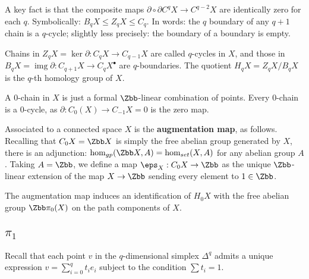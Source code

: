A key fact is that the composite maps $\partial \circ \partial C^{q}X\to C^{q-2}X $ are identically zero for each $q$. Symbolically: $B_qX \leq Z_q X \leq C_q$. In words: the $q$ boundary of any $q+1$ chain is a $q$-cycle; slightly less precisely: the boundary of a boundary is empty.

Chains in  $Z_qX=\operatorname{ker} \partial: C_q X \rightarrow C_{q-1} X$ are called $q$-cycles in $X$, and those in $B_q X=\operatorname{img} \partial: C_{q+1} X \rightarrow C_q X^{\bullet}$ are $q$-boundaries. The quotient $H_q X = Z_q X/B_q X$ is the $q$-th homology group of $X$.

\begin{remark}
  A $0$-chain in $X$ is just a formal $\Zbb$-linear combination of points. Every $0$-chain is a $0$-cycle, as $\partial:C_0(X) \to C_{-1}X=0$ is the zero map.
\end{remark}

Associated to a connected space $X$ is the \textbf{augmentation map}, as follows. Recalling that $C_0X = \Zbb X$ is simply the free abelian group generated by $X$, there is an adjunction: $\hom_{gp}(\Zbb X,A) = \hom_{set}(X,A)$ for any abelian group $A$. Taking $A = \Zbb$, we define a map $\eps_X : C_0 X \to \Zbb$ as the unique $\Zbb$-linear extension of the map $X\to \Zbb$ sending every element to $1\in \Zbb$.

\begin{lemma}
  The augmentation map induces an identification of $H_0X$ with the free abelian group $\Zbb \pi_0(X)$ on the path components of $X$.
\end{lemma}

\subsection*{$\pi_1$}

Recall that each point $v$ in the $q$-dimensional simplex $\Delta^q$ admits a unique expression $v = \sum_{i=0}^q t_i e_i$ subject to the condition $\sum t_i = 1$.


